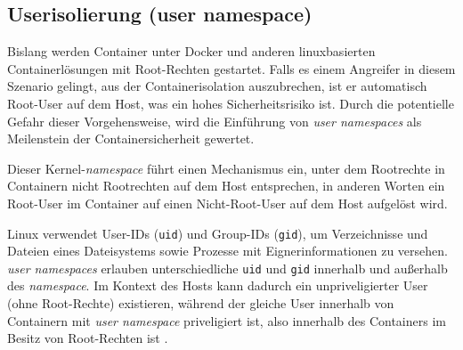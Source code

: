 \documentclass[../main.tex]{subfiles}
\begin{document}




    \subsection{Userisolierung (user namespace)}
			Bislang werden Container unter Docker und anderen linuxbasierten Containerlösungen mit Root-Rechten gestartet. Falls es einem Angreifer in diesem Szenario gelingt, aus der Containerisolation auszubrechen, ist er automatisch Root-User auf dem Host, was ein hohes Sicherheitsrisiko ist. Durch die potentielle Gefahr dieser Vorgehensweise, wird die Einführung von \emph{user namespaces} als Meilenstein der Containersicherheit gewertet.

			Dieser Kernel-\emph{namespace} führt einen Mechanismus ein, unter dem Rootrechte in Containern nicht Rootrechten auf dem Host entsprechen, in anderen Worten ein Root-User im Container auf einen Nicht-Root-User auf dem Host aufgelöst wird.

			Linux verwendet User-IDs (\texttt{uid}) und Group-IDs (\texttt{gid}), um Verzeichnisse und Dateien eines Dateisystems sowie Prozesse mit Eignerinformationen zu versehen. \emph{user namespaces} erlauben unterschiedliche \texttt{uid} und \texttt{gid} innerhalb und außerhalb des \emph{namespace}. Im Kontext des Hosts kann dadurch ein unpriveligierter User (ohne Root-Rechte) existieren, während der gleiche User innerhalb von Containern mit \emph{user namespace} priveligiert ist, also innerhalb des Containers im Besitz von Root-Rechten ist \cite{nsUser}.
\end{document}
